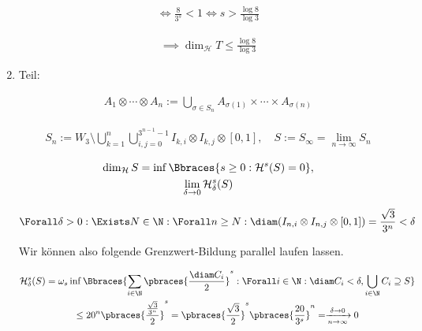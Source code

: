 \begin{solution}
\begin{enumerate}[label = \arabic*.]
    \begin{align*}
        \iff
        \frac{8}{3^s} < 1
        \iff
        s > \frac{\log 8}{\log 3}
    \end{align*}

    \begin{align*}
        \implies
        \dim_\mathcal{H} T \leq \frac{\log 8}{\log 3}
    \end{align*}

    \item Teil:
    
    \begin{align*}
        A_1 \otimes \cdots \otimes A_n
        :=
        \bigcup_{\sigma \in S_n}
            A_{\sigma(1)} \times \cdots \times A_{\sigma(n)}
    \end{align*}

    \begin{gather*}
        S_n
        :=
        W_3
        \setminus
        \bigcup_{k=1}^n
            \bigcup_{i, j = 0}^{3^{n-1} - 1}
                I_{k, i} \otimes I_{k, j} \otimes [0, 1],
        \quad
        S
        :=
        S_\infty
        =
        \lim_{n \to \infty}
            S_n
    \end{gather*}

    \begin{gather*}
        \dim_\mathcal{H} S
        =
        \inf
        \Bbraces
        {
            s \geq 0:
            \mathcal{H}^s(S) = 0
        }, \\
        \lim_{\delta \to 0}
            \mathcal{H}_\delta^s(S)
    \end{gather*}

    \begin{align*}
        \Forall \delta > 0:
            \Exists N \in \N:
                \Forall n \geq N:
                    \diam(I_{n, i} \otimes I_{n, j} \otimes [0, 1])
                    =
                    \frac{\sqrt 3}{3^n}
                    <
                    \delta
    \end{align*}

    Wir können also folgende Grenzwert-Bildung parallel laufen lassen.

    \begin{multline*}
        \mathcal{H}_\delta^s(S)
        =
        \omega_s
        \inf
        \Bbraces
        {
            \sum_{i \in \N}
                \pbraces
                {
                    \frac{\diam C_i}{2}
                }^s:
            \Forall i \in \N:
                \diam C_i < \delta,
            \bigcup_{i \in \N}
                C_i
            \supseteq
            S
        } \\
        \leq
        20^n
        \pbraces
        {
            \frac
            {
                \frac{\sqrt 3}{3^n}
            }{2}
        }^s
        =
        \pbraces
        {
            \frac{\sqrt 3}{2}
        }^s
        \pbraces
        {
            \frac{20}{3^s}
        }^n
        =
        \xrightarrow[n \to \infty]{\delta \to 0}
        0
    \end{multline*}


\end{enumerate}
\end{solution}
